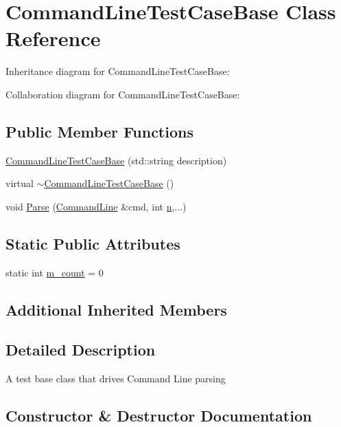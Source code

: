 \hypertarget{classCommandLineTestCaseBase}{}\section{Command\+Line\+Test\+Case\+Base Class Reference}
\label{classCommandLineTestCaseBase}


Inheritance diagram for Command\+Line\+Test\+Case\+Base\+:


Collaboration diagram for Command\+Line\+Test\+Case\+Base\+:
\subsection*{Public Member Functions}
\begin{DoxyCompactItemize}
\item 
\hyperlink{classCommandLineTestCaseBase_a39465839aa2c437a7a1ae62b413507d7}{Command\+Line\+Test\+Case\+Base} (std\+::string description)
\item 
virtual \hyperlink{classCommandLineTestCaseBase_adfe6480dc3b3899ed20677fdfac17d0f}{$\sim$\+Command\+Line\+Test\+Case\+Base} ()
\item 
void \hyperlink{classCommandLineTestCaseBase_aa8bbc2d366637977fd21170282baaa0c}{Parse} (\hyperlink{classns3_1_1CommandLine}{Command\+Line} \&cmd, int \hyperlink{lte__link__budget__x2__handover__measures_8m_abdb05bc5a064cf642a06c83b3392f148}{n},...)
\end{DoxyCompactItemize}
\subsection*{Static Public Attributes}
\begin{DoxyCompactItemize}
\item 
static int \hyperlink{classCommandLineTestCaseBase_ac14c386e0b97357f0189d4938abcd791}{m\+\_\+count} = 0
\end{DoxyCompactItemize}
\subsection*{Additional Inherited Members}


\subsection{Detailed Description}
A test base class that drives Command Line parsing 

\subsection{Constructor \& Destructor Documentation}
